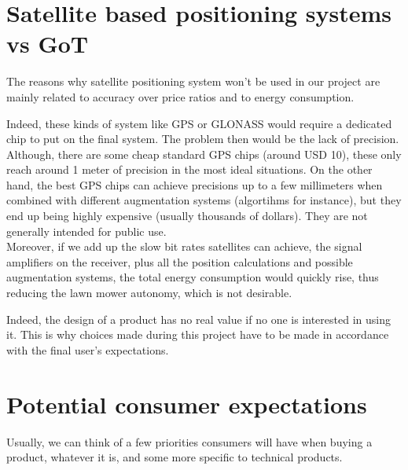 \section{Satellite based positioning systems vs GoT}
The reasons why satellite positioning system won't be used in our project are mainly related to accuracy over price ratios and to energy consumption.

\noindent
Indeed, these kinds of system like GPS or GLONASS would require a dedicated chip to put on the final system. The problem then would be the lack of precision. Although, there are some cheap standard GPS chips (around USD 10), these only reach around 1 meter of precision in the most ideal situations. %
On the other hand, the best GPS chips can achieve precisions up to a few millimeters when combined with different augmentation systems (algortihms for instance), but they end up being highly expensive (usually thousands of dollars). They are not generally intended for public use.
 \\

\noindent
Moreover, if we add up the slow bit rates satellites can achieve, the signal amplifiers on the receiver, plus all the position calculations and possible augmentation systems, the total energy consumption would quickly rise, thus reducing the lawn mower autonomy, which is not desirable.

Indeed, the design of a product has no real value if no one is interested in using it. This is why choices made during this project have to be made in accordance with the final user's expectations.\\

\section{Potential consumer expectations}
Usually, we can think of a few priorities consumers will have when buying a product, whatever it is, and some more specific to technical products.

